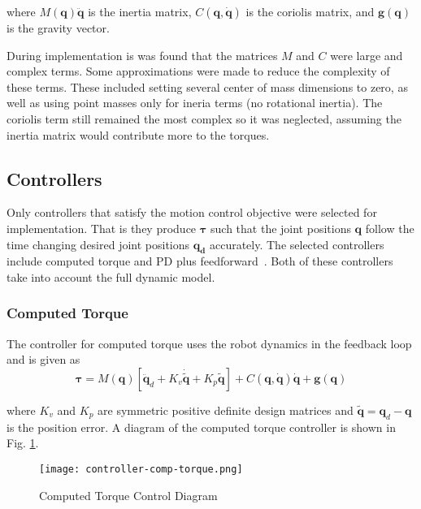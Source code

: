 \documentclass[conference]{IEEEtran}
\begin{document}
where $M(\boldsymbol{q})\ddot{\boldsymbol{q}}$ is the inertia matrix,
$C(\boldsymbol{q}, \dot{\boldsymbol{q}})$ is the coriolis matrix, and
$\boldsymbol{g}(\boldsymbol{q})$ is the gravity vector.

During implementation is was found that the matrices $M$ and $C$ were large and
complex terms. Some approximations were made to reduce the complexity of these
terms. These included setting several center of mass dimensions to zero, as well
as using point masses only for ineria terms (no rotational inertia). The
coriolis term still remained the most complex so it was neglected, assuming the
inertia matrix would contribute more to the torques.

\subsection{Controllers}
Only controllers that satisfy the motion control objective were selected for
implementation. That is they produce $\boldsymbol{\tau}$ such that the joint
positions $\boldsymbol{q}$ follow the time changing desired joint positions
$\boldsymbol{q_d}$ accurately. The selected controllers include computed torque
and PD plus feedforward~\cite{kelly2007control}. Both of these controllers take
into account the full dynamic model.

\subsubsection{Computed Torque}
The controller for computed torque uses the robot dynamics in the feedback loop
and is given as
\begin{equation*}
  \boldsymbol{\tau} = M(\boldsymbol{q}) \left [ \ddot{\boldsymbol{q}}_d + K_v \dot{\tilde{\boldsymbol{q}}} + K_p \tilde{\boldsymbol{q}} \right ] + C(\boldsymbol{q}, \dot{\boldsymbol{q}})\dot{\boldsymbol{q}} + \boldsymbol{g}(\boldsymbol{q})
\end{equation*}

where $K_v$ and $K_p$ are symmetric positive definite design matrices and
$\tilde{\boldsymbol{q}} = \boldsymbol{q}_d - \boldsymbol{q}$ is the position
error. A diagram of the computed torque controller is shown in
Fig. \ref{fig:comp-torque}.

\begin{figure}[!t]
  \texttt{[image: controller-comp-torque.png]}
  \caption{Computed Torque Control Diagram}
  \label{fig:comp-torque}
\end{figure}
\end{document}
